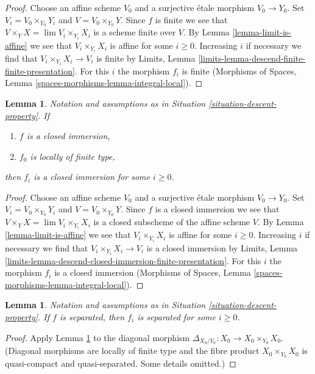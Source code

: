 \documentclass{stacks-project}
\theoremstyle{plain}
\newtheorem{lemma}[subsection]{Lemma}
\theoremstyle{definition}
\theoremstyle{remark}
\numberwithin{equation}{subsection}
\def\lim{\mathop{\mathrm{lim}}\nolimits}
\begin{document}
\begin{proof}
Choose an affine scheme $V_0$ and a surjective \'etale morphism $V_0 \to Y_0$.
Set $V_i = V_0 \times_{Y_0} Y_i$ and $V = V_0 \times_{Y_0} Y$.
Since $f$ is finite we see that $V \times_Y X = \lim V_i \times_{Y_i} X_i$
is a scheme finite over $V$. By Lemma \ref{lemma-limit-is-affine} we see that
$V_i \times_{Y_i} X_i$ is affine for some $i \geq 0$. Increasing $i$ if
necessary we find that $V_i \times_{Y_i} X_i \to V_i$ is finite by
Limits, Lemma \ref{limits-lemma-descend-finite-finite-presentation}.
For this $i$ the morphism $f_i$ is finite
(Morphisms of Spaces, Lemma \ref{spaces-morphisms-lemma-integral-local}).
\end{proof}

\begin{lemma}
\label{lemma-descend-closed-immersion}
Notation and assumptions as in Situation \ref{situation-descent-property}. If
\begin{enumerate}
\item $f$ is a closed immersion,
\item $f_0$ is locally of finite type,
\end{enumerate}
then $f_i$ is a closed immersion for some $i \geq 0$.
\end{lemma}

\begin{proof}
Choose an affine scheme $V_0$ and a surjective \'etale morphism $V_0 \to Y_0$.
Set $V_i = V_0 \times_{Y_0} Y_i$ and $V = V_0 \times_{Y_0} Y$.
Since $f$ is a closed immersion we see that
$V \times_Y X = \lim V_i \times_{Y_i} X_i$
is a closed subscheme of the affine scheme $V$. By
Lemma \ref{lemma-limit-is-affine} we see that
$V_i \times_{Y_i} X_i$ is affine for some $i \geq 0$. Increasing $i$ if
necessary we find that $V_i \times_{Y_i} X_i \to V_i$ is a closed immersion by
Limits, Lemma \ref{limits-lemma-descend-closed-immersion-finite-presentation}.
For this $i$ the morphism $f_i$ is a closed immersion
(Morphisms of Spaces, Lemma \ref{spaces-morphisms-lemma-integral-local}).
\end{proof}

\begin{lemma}
\label{lemma-descend-separated-morphism}
Notation and assumptions as in Situation \ref{situation-descent-property}.
If $f$ is separated, then $f_i$ is separated for some $i \geq 0$.
\end{lemma}

\begin{proof}
Apply Lemma \ref{lemma-descend-closed-immersion}
to the diagonal morphism $\Delta_{X_0/Y_0} : X_0 \to X_0 \times_{Y_0} X_0$.
(Diagonal morphisms are locally of finite type
and the fibre product $X_0 \times_{Y_0} X_0$ is quasi-compact and
quasi-separated. Some details omitted.)
\end{proof}
\end{document}
